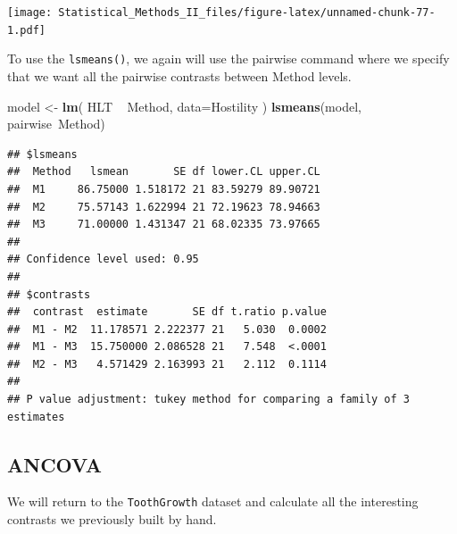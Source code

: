 \documentclass[]{book}
\newenvironment{Shaded}{\begin{snugshade}}{\end{snugshade}}
\newcommand{\KeywordTok}[1]{\textcolor[rgb]{0.13,0.29,0.53}{\textbf{{#1}}}}
\newcommand{\DataTypeTok}[1]{\textcolor[rgb]{0.13,0.29,0.53}{{#1}}}
\newcommand{\DecValTok}[1]{\textcolor[rgb]{0.00,0.00,0.81}{{#1}}}
\newcommand{\StringTok}[1]{\textcolor[rgb]{0.31,0.60,0.02}{{#1}}}
\newcommand{\NormalTok}[1]{{#1}}
\theoremstyle{definition}
\theoremstyle{definition}
\theoremstyle{remark}
\begin{document}
\texttt{[image: Statistical\_Methods\_II\_files/figure-latex/unnamed-chunk-77-1.pdf]}

To use the \texttt{lsmeans()}, we again will use the pairwise command
where we specify that we want all the pairwise contrasts between Method
levels.

\begin{Shaded}
\begin{Highlighting}[]
\NormalTok{model <-}\StringTok{ }\KeywordTok{lm}\NormalTok{( HLT ~}\StringTok{ }\NormalTok{Method, }\DataTypeTok{data=}\NormalTok{Hostility )}
\KeywordTok{lsmeans}\NormalTok{(model, pairwise~Method)}
\end{Highlighting}
\end{Shaded}

\begin{verbatim}
## $lsmeans
##  Method   lsmean       SE df lower.CL upper.CL
##  M1     86.75000 1.518172 21 83.59279 89.90721
##  M2     75.57143 1.622994 21 72.19623 78.94663
##  M3     71.00000 1.431347 21 68.02335 73.97665
## 
## Confidence level used: 0.95 
## 
## $contrasts
##  contrast  estimate       SE df t.ratio p.value
##  M1 - M2  11.178571 2.222377 21   5.030  0.0002
##  M1 - M3  15.750000 2.086528 21   7.548  <.0001
##  M2 - M3   4.571429 2.163993 21   2.112  0.1114
## 
## P value adjustment: tukey method for comparing a family of 3 estimates
\end{verbatim}

\subsection{ANCOVA}\label{ancova}

We will return to the \texttt{ToothGrowth} dataset and calculate all the
interesting contrasts we previously built by hand.

\begin{Shaded}
\end{Shaded}
\end{document}
